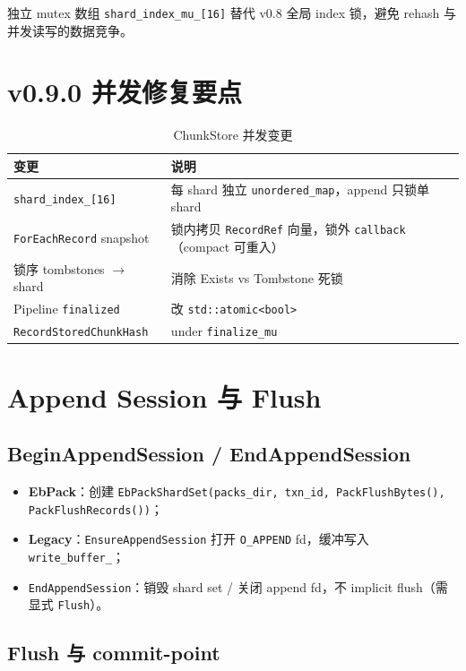 独立 mutex 数组 \texttt{shard\_index\_mu\_[16]} 替代 v0.8 全局 index 锁，避免 rehash 与并发读写的数据竞争。

\section{v0.9.0 并发修复要点}

\begin{table}[htbp]
\centering
\caption{ ChunkStore 并发变更}
\begin{tabular}{@{}lp{9cm}@{}}
\toprule
变更 & 说明 \\
\midrule
\texttt{shard\_index\_[16]} & 每 shard 独立 \texttt{unordered\_map}，append 只锁单 shard \\
\texttt{ForEachRecord} snapshot & 锁内拷贝 \texttt{RecordRef} 向量，锁外 \texttt{callback}（compact 可重入） \\
锁序 tombstones $\rightarrow$ shard & 消除 Exists vs Tombstone 死锁 \\
Pipeline \texttt{finalized} & 改 \texttt{std::atomic<bool>} \\
\texttt{RecordStoredChunkHash} & under \texttt{finalize\_mu} \\
\bottomrule
\end{tabular}
\end{table}

\section{Append Session 与 Flush}

\subsection{BeginAppendSession / EndAppendSession}

\begin{itemize}
  \item \textbf{EbPack}：创建 \texttt{EbPackShardSet(packs\_dir, txn\_id, PackFlushBytes(), PackFlushRecords())}；
  \item \textbf{Legacy}：\texttt{EnsureAppendSession} 打开 \texttt{O\_APPEND} fd，缓冲写入 \texttt{write\_buffer\_}；
  \item \texttt{EndAppendSession}：销毁 shard set / 关闭 append fd，不 implicit flush（需显式 \texttt{Flush}）。
\end{itemize}

\subsection{Flush 与 commit-point}

